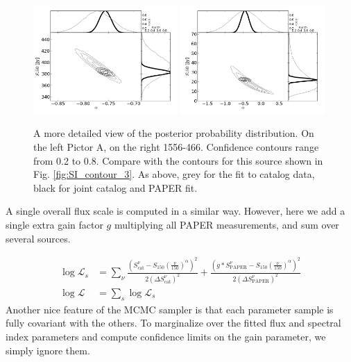 \documentclass[preprint]{aastex}
\newcommand{\PAPER}{\mathrm{PAPER}}
\begin{document}
\begin{figure}[htbp]
\includegraphics[width=0.49\textwidth]{plots/pic_trace_hist.png}
\includegraphics[width=0.49\textwidth]{plots/1556-466_trace_hist.png}
\caption{A more detailed view of the posterior probability distribution. On the left Pictor A, on the right 1556-466. Confidence contours range from 0.2 to 0.8. Compare with the contours for this source shown in Fig. \ref{fig:SI_contour_3}.  As above, grey for  the fit to catalog data, black for joint catalog and PAPER fit. }
\end{figure}


A single overall flux scale is computed in a similar way. However, here we add a single extra gain factor $g$ multiplying all PAPER measurements, and sum over several sources.

\begin{align}
\log\mathcal{L}_s &= \sum_{\nu}\frac{ (S_\textrm{cat}^{\nu}  - S_{150}  \left(\frac{\nu}{150}\right)^\alpha)^2}{2(\Delta S_\textrm{cat}^\nu)^2} +
\frac{ (g*S_\PAPER^{\nu}  - S_{150}\left(\frac{\nu}{150}\right)^\alpha)^2}{2(\Delta S_\PAPER^\nu)^2}\\
\log\mathcal{L} &= \sum_{s} \log\mathcal{L}_s
\end{align}
Another nice feature of the MCMC sampler is that each parameter sample is fully covariant with the others. To marginalize over the fitted flux and spectral index parameters and compute confidence limits on the gain parameter, we simply ignore them.
\end{document}
